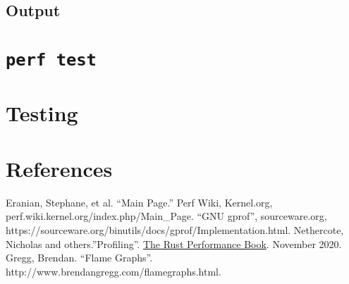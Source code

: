 \documentclass{article}
\begin{document}
\subsection{Output}
\section{\texttt{perf test}}
\section{Testing}
\pagebreak
\section{References}
Eranian, Stephane, et al. “Main Page.” Perf Wiki, Kernel.org,
\\perf.wiki.kernel.org/index.php/Main\_Page.
``GNU gprof'', sourceware.org,
https://sourceware.org/binutils/docs/gprof/Implementation.html.
Nethercote, Nicholas and others.''Profiling''. \underline{The Rust Performance Book}. November 2020.
Gregg, Brendan. ``Flame Graphs''. http://www.brendangregg.com/flamegraphs.html.
\end{document}
